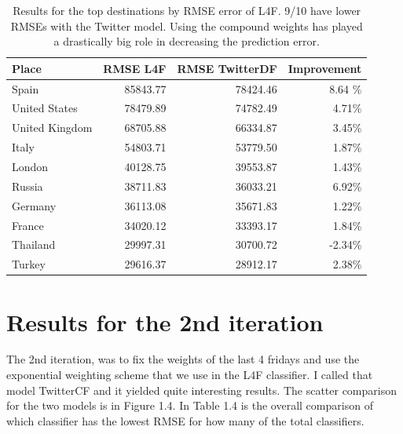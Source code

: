 \documentclass[minf,frontabs,twoside,singlespacing,parskip]{infthesis}
\begin{document}
\begin{table}[h!]
\begin{center}
\begin{tabular}{ l | r | r | r}
Place & RMSE L4F & RMSE TwitterDF & Improvement \\
\hline
Spain & 85843.77 & 78424.46 & 8.64 \% \\
United States & 78479.89 & 74782.49 & 4.71\% \\
United Kingdom & 68705.88 & 66334.87 & 3.45\% \\
Italy & 54803.71 & 53779.50 & 1.87\% \\
London & 40128.75 & 39553.87 & 1.43\% \\
Russia & 38711.83 & 36033.21 & 6.92\% \\
Germany & 36113.08 & 35671.83 & 1.22\% \\
France & 34020.12 & 33393.17 & 1.84\% \\
Thailand & 29997.31 & 30700.72 & -2.34\% \\
Turkey & 29616.37 & 28912.17 & 2.38\% \\
\end{tabular}
\end{center}
\caption{Results for the top destinations by RMSE error of L4F. 9/10 have lower RMSEs with the Twitter model. Using the compound weights has played a drastically big role in decreasing the prediction error.}
\end{table}


\newpage
\section{Results for the 2nd iteration}

The 2nd iteration, was to fix the weights of the last 4 fridays and use the exponential weighting scheme that we use in the L4F classifier. I called that model TwitterCF and it yielded quite interesting results. The scatter comparison for the two models is in Figure 1.4. In Table 1.4 is the overall comparison of which classifier has the lowest RMSE for how many of the total classifiers. 
\end{document}
